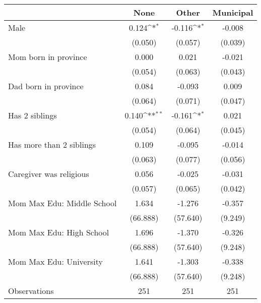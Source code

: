 {
\def\sym#1{\ifmmode^{#1}\else\(^{#1}\)\fi}
\begin{tabular}{l*{3}{c}}
\toprule
                    &\multicolumn{1}{c}{None}&\multicolumn{1}{c}{Other}&\multicolumn{1}{c}{Municipal}\\
\midrule
Male                &       0.124\sym{*}  &      -0.116\sym{*}  &      -0.008         \\
                    &     (0.050)         &     (0.057)         &     (0.039)         \\
\addlinespace
Mom born in province&       0.000         &       0.021         &      -0.021         \\
                    &     (0.054)         &     (0.063)         &     (0.043)         \\
\addlinespace
Dad born in province&       0.084         &      -0.093         &       0.009         \\
                    &     (0.064)         &     (0.071)         &     (0.047)         \\
\addlinespace
Has 2 siblings      &       0.140\sym{**} &      -0.161\sym{*}  &       0.021         \\
                    &     (0.054)         &     (0.064)         &     (0.045)         \\
\addlinespace
Has more than 2 siblings&       0.109         &      -0.095         &      -0.014         \\
                    &     (0.063)         &     (0.077)         &     (0.056)         \\
\addlinespace
Caregiver was religious&       0.056         &      -0.025         &      -0.031         \\
                    &     (0.057)         &     (0.065)         &     (0.042)         \\
\addlinespace
Mom Max Edu: Middle School&       1.634         &      -1.276         &      -0.357         \\
                    &    (66.888)         &    (57.640)         &     (9.249)         \\
\addlinespace
Mom Max Edu: High School&       1.696         &      -1.370         &      -0.326         \\
                    &    (66.888)         &    (57.640)         &     (9.248)         \\
\addlinespace
Mom Max Edu: University&       1.641         &      -1.303         &      -0.338         \\
                    &    (66.888)         &    (57.640)         &     (9.248)         \\
\midrule
Observations        &         251         &         251         &         251         \\
\bottomrule
\end{tabular}
}
